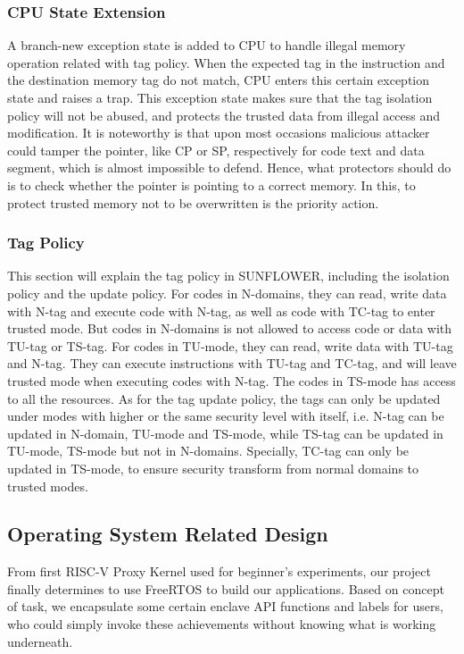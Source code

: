 \documentclass[conference]{IEEEtran}
\begin{document}
\subsubsection{CPU State Extension}
A branch-new exception state is added to CPU to handle illegal memory operation related with tag policy. When the expected tag in the instruction and the destination memory tag do not match, CPU enters this certain exception state and raises a trap. This exception state makes sure that the tag isolation policy will not be abused, and protects the trusted data from illegal access and modification. It is noteworthy is that upon most occasions malicious attacker could tamper the pointer, like CP or SP, respectively for code text and data segment, which is almost impossible to defend. Hence, what protectors should do is to check whether the pointer is pointing to a correct memory. In this, to protect trusted memory not to be overwritten is the priority action. 

\subsubsection{Tag Policy}
This section will explain the tag policy in SUNFLOWER, including the isolation policy and the update policy. For codes in N-domains, they can read, write data with N-tag and execute code with N-tag, as well as code with TC-tag to enter trusted mode. But codes in N-domains is not allowed to access code or data with TU-tag or TS-tag. For codes in TU-mode, they can read, write data with TU-tag and N-tag. They can execute instructions with TU-tag and TC-tag, and will leave trusted mode when executing codes with N-tag. The codes in TS-mode has access to all the resources. As for the tag update policy, the tags can only be updated under modes with higher or the same security level with itself, i.e. N-tag can be updated in N-domain, TU-mode and TS-mode, while TS-tag can be updated in TU-mode, TS-mode but not in N-domains. Specially, TC-tag can only be updated in TS-mode, to ensure security transform from normal domains to trusted modes. 


\subsection{Operating System Related Design}

From first RISC-V Proxy Kernel used for beginner's experiments, our project finally determines to use FreeRTOS to build our applications. Based on concept of task, we encapsulate some certain enclave API functions and labels for users, who could simply invoke these achievements without knowing what is working underneath. 
\end{document}
